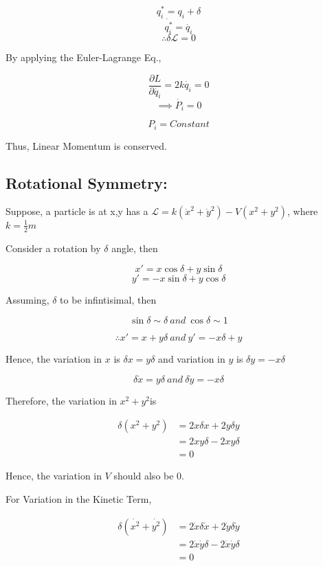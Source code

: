 \documentclass[a4paper]{article}
\newcommand{\Lagr}{\mathcal{L}}
\newcommand{\pdt}[2]{\frac{\partial #1}{\partial #2}}
\newcommand{\half}{\frac{1}{2}}
\begin{document}
			$$ q_i^* = q_i + \delta $$
			$$ \dot{q_i^*} = \dot{q_i} $$
			$$\therefore \delta \Lagr = 0 $$

			By applying the Euler-Lagrange Eq., 

			$$ \pdt{L}{\dot{q_i}} = 2k\dot{q_i} = 0 $$
			$$\implies \dot{P_i} = 0 $$

			$$ P_i = Constant $$

			Thus, Linear Momentum is conserved.

		\subsection*{Rotational Symmetry: }

			\noindent

			Suppose, a particle is at x,y has a $\Lagr = k (\dot{x}^2 + \dot{y}^2) - V(x^2 + y^2)$, where $ k = \half m $	

			Consider a rotation by $\delta$ angle, then

			$$ x' = x\cos{\delta} + y\sin{\delta} $$
			$$ y' = -x\sin{\delta} + y\cos{\delta} $$

			Assuming, $\delta$ to be infintisimal, then

			$$ \sin{\delta} \sim \delta\ and\ \cos{\delta} \sim 1 $$

			$$\therefore x' = x + y\delta\ and\ y' = -x\delta + y $$

			Hence, the variation in $x$ is $\delta x = y \delta$ and variation in $y$ is $\delta y = -x \delta $

			$$ \delta \dot{x} = y \delta\ and\ \delta \dot{y} = - x \delta $$

			Therefore, the variation in $x^2 + y^2$is
			
			\begin{equation}
				\begin{split}	
					\delta (x^2 + y^2) & = 2 x \delta x + 2y \delta y \\
					&= 2 x y \delta - 2 x y \delta  \\
					& = 0
				\end{split}
			\end{equation}
			
			Hence, the variation in $V$ should also be $0$.

			For Variation in the Kinetic Term,

			\begin{equation}
				\begin{split}	
					\delta (\dot{x^2} + \dot{y^2}) & = 2 \dot{x} \delta \dot{x} + 2 \dot{y} \delta \dot{y} \\
					& = 2 \dot{x} \dot{y} \delta - 2 \dot{x} \dot{y} \delta \\
					& = 0
				\end{split}
			\end{equation}
			
\end{document}
